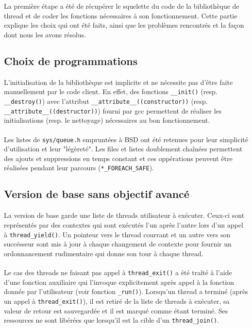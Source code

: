 La première étape a été de récupérer le squelette du code de la bibliothèque de thread et de coder les fonctions nécessaires à son fonctionnement. Cette partie explique les choix qui ont été faits, ainsi que les problèmes rencontrés et la façon dont nous les avons résolus.

\subsection{Choix de programmations}

\paragraph{} L'initialisation de la bibliothèque est implicite et ne nécessite
pas d'être faite manuellement par le code client. En effet, des fonctions
\verb!__init()!  (resp. \verb!__destroy()!) avec l'attribut
\verb!__attribute__((constructor))!  (resp.
\verb!__attribute__((destructor))!) fourni par gcc permettent de réaliser les
initialisations (resp. le nettoyage) nécessaires au bon fonctionnement.

\paragraph{} Les listes de \verb!sys/queue.h! empruntées à BSD ont été
retenues pour leur simplicité d'utilisation et leur "légèreté". Les files et
listes doublement chaînées permettent des ajouts et suppressions en temps
constant et ces oppérations peuvent être réalisées pendant leur parcours
(\verb!*_FOREACH_SAFE!).


\subsection{Version de base sans objectif avancé}

\paragraph{} La version de base garde une liste de threads utilisateur à exécuter. Ceux-ci sont représentés par des contextes qui sont exécutés l'un après l'autre lors d'un appel à \verb!thread_yield()!. Un pointeur vers le thread courrant et un autre vers son succésseur sont mis à jour à chaque changement de contexte pour fournir un ordonnancement rudimentaire qui donne son tour à chaque thread.

\paragraph{} Le cas des threads ne faisant pas appel à \verb!thread_exit()! a été traîté à l'aide d'une fonction auxiliaire qui l'invoque explicitement après appel à la fonction donnée par l'utilisateur (voir fonction \verb!_run()!). Lorsqu'un thread a terminé (après un appel à \verb!thread_exit()!), il est retiré de la liste de threads à exécuter, sa valeur de retour est sauvegardée et il est marqué comme étant terminé. Ses ressources ne sont libérées que lorsqu'il est la cible d'un \verb!thread_join()!.


